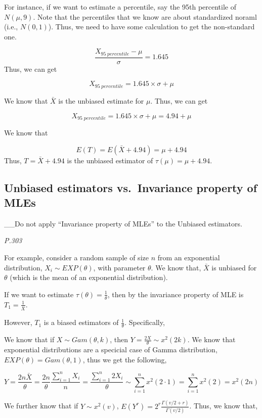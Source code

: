 \documentclass[
]{book}
\begin{document}
For instance, if we want to estimate a percentile, say the 95th percentile of \(N(\mu,9)\). Note that the percentiles that we know are about standardized noraml (i.e., \(N(0,1)\)). Thus, we need to have some calculation to get the non-standard one.

\[\frac{X_{95 \; percentile}-\mu}{\sigma}=1.645\]
Thus, we can get

\[X_{95 \; percentile}=1.645 \times \sigma +\mu\]

We know that \(\bar{X}\) is the unbiased estimate for \(\mu\). Thus, we can get

\[X_{95 \; percentile}=1.645 \times \sigma +\mu=4.94+\mu\]

We know that

\[E(T)=E(\bar{X}+4.94)=\mu+4.94\]
Thus, \(T=\bar{X}+4.94\) is the unbiased estimator of \(\tau(\mu)=\mu+4.94\).

\hypertarget{unbiased-estimators-vs.-invariance-property-of-mles}{%
\subsection{Unbiased estimators vs.~Invariance property of MLEs}\label{unbiased-estimators-vs.-invariance-property-of-mles}}

\_\_Do not apply ``Invariance property of MLEs'' to the Unbiased estimators.

\emph{P.303}

For example, consider a random sample of size \(n\) from an exponential distribution, \(X_i \sim EXP(\theta)\), with parameter \(\theta\). We know that, \(\bar{X}\) is unbiased for \(\theta\) (which is the mean of an exponential distribution).

If we want to estimate \(\tau(\theta)=\frac{1}{\theta}\), then by the invariance property of MLE is \(T_1=\frac{1}{\bar{X}}\).

However, \(T_1\) is a biased estimators of \(\frac{1}{\theta}\). Specifically,

We know that if \(X \sim Gam(\theta,k)\), then \(Y=\frac{2X}{\theta} \sim x^2(2k)\). We know that exponential distributions are a specicial case of Gamma distribution, \(EXP(\theta)=Gam(\theta,1)\), thus we get the following,

\[Y=\frac{2n\bar{X}}{\theta}=\frac{2n}{\theta} \frac{\sum_{i=1}^n X_i}{n}=\frac{\sum_{i=1}^n 2X_i}{\theta}\sim\sum_{i=1}^n x^2(2\cdot1)=\sum_{i=1}^n x^2(2)=x^2(2n)\]

We further know that if \(Y \sim x^2(v)\), \(E(Y^r)=2^r\frac{\Gamma(v/2+r)}{\Gamma(v/2)}\). Thus, we know that,
\end{document}
